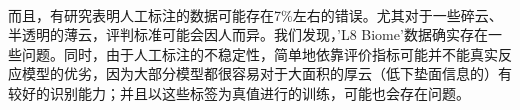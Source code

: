 \documentclass[10pt]{ctexart}
\newcommand{\upcite}[1]{\textsuperscript{\textsuperscript{\cite{#1}}}}
\begin{document}
\begin{multicols}{2}

而且，有研究表明\upcite{scaramuzza2011development}人工标注的数据可能存在7\%左右的错误。尤其对于一些碎云、半透明的薄云，评判标准可能会因人而异。我们发现，'L8 Biome'数据确实存在一些问题。同时，由于人工标注的不稳定性，简单地依靠评价指标可能并不能真实反应模型的优劣，因为大部分模型都很容易对于大面积的厚云（低下垫面信息的）有较好的识别能力；并且以这些标签为真值进行的训练，可能也会存在问题。


\end{multicols}
\end{document}
